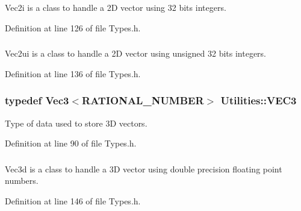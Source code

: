 Vec2i is a class to handle a 2D vector using 32 bits integers. 



Definition at line 126 of file Types.h.

\hypertarget{namespace_utilities_a4a3a98a70cd4c9af9c3e49584516902f}{
\subsubsection[{Vec2ui}]{}}
\label{namespace_utilities_a4a3a98a70cd4c9af9c3e49584516902f}


Vec2ui is a class to handle a 2D vector using unsigned 32 bits integers. 



Definition at line 136 of file Types.h.

\hypertarget{namespace_utilities_af627ed108a4935196373499e157d3937}{
\subsubsection[{VEC3}]{\setlength{\rightskip}{0pt plus 5cm}typedef {\bf Vec3}$<${\bf RATIONAL\_\-NUMBER}$>$ {\bf Utilities::VEC3}}}
\label{namespace_utilities_af627ed108a4935196373499e157d3937}


Type of data used to store 3D vectors. 



Definition at line 90 of file Types.h.

\hypertarget{namespace_utilities_ab28ebcaa8d9272ab9f9375205bded517}{
\subsubsection[{Vec3d}]{}}
\label{namespace_utilities_ab28ebcaa8d9272ab9f9375205bded517}


Vec3d is a class to handle a 3D vector using double precision floating point numbers. 



Definition at line 146 of file Types.h.

\hypertarget{namespace_utilities_a39dfee93d59fd420ecf496f66606cbdd}{
\subsubsection[{Vec3f}]{}}
\label{namespace_utilities_a39dfee93d59fd420ecf496f66606cbdd}


